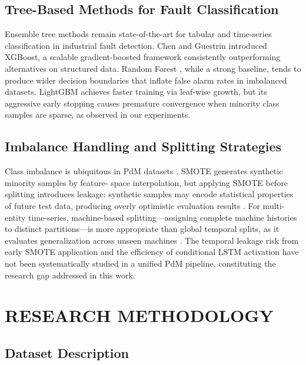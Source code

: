 \documentclass[conference]{IEEEtran}
\begin{document}
\subsection{Tree-Based Methods for Fault Classification}
Ensemble tree methods remain state-of-the-art for tabular and time-series
classification in industrial fault detection. Chen and Guestrin
\cite{chen2016xgboost} introduced XGBoost, a scalable gradient-boosted
framework consistently outperforming alternatives on structured data. Random
Forest \cite{breiman2001rf}, while a strong baseline, tends to produce wider
decision boundaries that inflate false alarm rates in imbalanced datasets.
LightGBM \cite{ke2017lightgbm} achieves faster training via leaf-wise growth,
but its aggressive early stopping causes premature convergence when minority
class samples are sparse, as observed in our experiments.

\subsection{Imbalance Handling and Splitting Strategies}
Class imbalance is ubiquitous in PdM datasets \cite{li2020pdmimbalance}.
SMOTE \cite{chawla2002smote} generates synthetic minority samples by feature-
space interpolation, but applying SMOTE before splitting introduces leakage:
synthetic samples may encode statistical properties of future test data,
producing overly optimistic evaluation results \cite{blagus2013smote_bias}.
For multi-entity time-series, machine-based splitting---assigning complete
machine histories to distinct partitions---is more appropriate than global
temporal splits, as it evaluates generalization across unseen machines
\cite{bergmeir2018tscv}. The temporal leakage risk from early SMOTE
application and the efficiency of conditional LSTM activation have not been
systematically studied in a unified PdM pipeline, constituting the research
gap addressed in this work.

\section{RESEARCH METHODOLOGY}

\subsection{Dataset Description}
\end{document}
